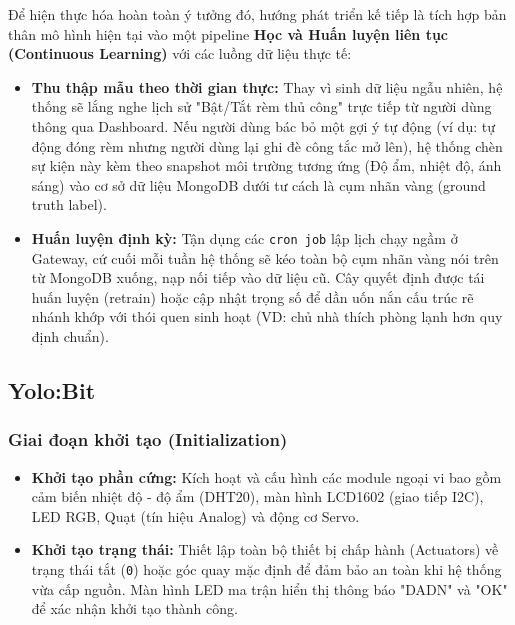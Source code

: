 Để hiện thực hóa hoàn toàn ý tưởng đó, hướng phát triển kế tiếp là tích hợp bản thân mô hình hiện tại vào một pipeline \textbf{Học và Huấn luyện liên tục (Continuous Learning)} với các luồng dữ liệu thực tế:
\begin{itemize}
    \item \textbf{Thu thập mẫu theo thời gian thực:} Thay vì sinh dữ liệu ngẫu nhiên, hệ thống sẽ lắng nghe lịch sử "Bật/Tắt rèm thủ công" trực tiếp từ người dùng thông qua Dashboard. Nếu người dùng bác bỏ một gợi ý tự động (ví dụ: tự động đóng rèm nhưng người dùng lại ghi đè công tắc mở lên), hệ thống chèn sự kiện này kèm theo snapshot môi trường tương ứng (Độ ẩm, nhiệt độ, ánh sáng) vào cơ sở dữ liệu MongoDB dưới tư cách là cụm nhãn vàng (ground truth label).
    \item \textbf{Huấn luyện định kỳ:} Tận dụng các \texttt{cron job} lập lịch chạy ngầm ở Gateway, cứ cuối mỗi tuần hệ thống sẽ kéo toàn bộ cụm nhãn vàng nói trên từ MongoDB xuống, nạp nối tiếp vào dữ liệu cũ. Cây quyết định được tái huấn luyện (retrain) hoặc cập nhật trọng số để dần uốn nắn cấu trúc rẽ nhánh khớp với thói quen sinh hoạt (VD: chủ nhà thích phòng lạnh hơn quy định chuẩn).
   
\end{itemize}

\subsection{Yolo:Bit}
  \subsubsection{Giai đoạn khởi tạo (Initialization)}
\begin{itemize}
    \item \textbf{Khởi tạo phần cứng:} Kích hoạt và cấu hình các module ngoại vi bao gồm cảm biến nhiệt độ - độ ẩm (DHT20), màn hình LCD1602 (giao tiếp I2C), LED RGB, Quạt (tín hiệu Analog) và động cơ Servo.
    \item \textbf{Khởi tạo trạng thái:} Thiết lập toàn bộ thiết bị chấp hành (Actuators) về trạng thái tắt (\texttt{0}) hoặc góc quay mặc định để đảm bảo an toàn khi hệ thống vừa cấp nguồn. Màn hình LED ma trận hiển thị thông báo "DADN" và "OK" để xác nhận khởi tạo thành công.
\end{itemize}

